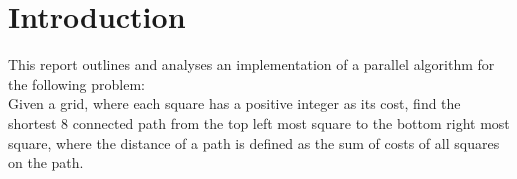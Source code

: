 \documentclass{article}
\begin{document}
\section*{Introduction}
This report outlines and analyses an implementation of a parallel algorithm for the following
problem:\\
Given a grid, where each square has a positive integer as its cost, find the shortest 8 connected
path from the top left most square to the bottom right most square, where the distance of a path is
defined as the sum of costs of all squares on the path.
\end{document}
